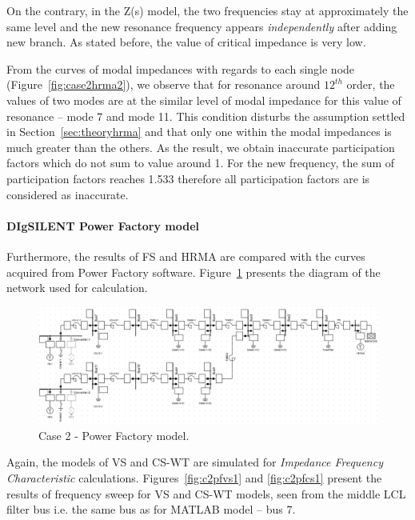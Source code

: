 \documentclass[12pt]{report} %
\begin{document}
On the contrary, in the Z(s) model, the two frequencies stay at approximately the same level and the new resonance frequency appears \textit{independently} after adding new branch. As stated before, the value of critical impedance is very low.

From the curves of modal impedances with regards to each single node (Figure~\ref{fig:case2hrma2}), we observe that for resonance around $12^{th}$ order, the values of two modes are at the similar level of modal impedance for this value of resonance – mode 7 and mode 11. This condition disturbs the assumption settled in Section~\ref{sec:theoryhrma} and \cite{xu2005} that only one within the modal impedances is much greater than the others. As the result, we obtain inaccurate participation factors which do not sum to value around 1. For the new frequency, the sum of participation factors reaches 1.533 therefore all participation factors are is considered as inaccurate.

\paragraph{DIgSILENT Power Factory model}
Furthermore, the results of FS and HRMA are compared with the curves acquired from Power Factory software. Figure~\ref{fig:c2pfmodel} presents the diagram of the network used for calculation.

\begin{figure}[htb]
	\centering
	\includegraphics[width=1\textwidth]{img/Case2/PF_model.png}
  	\caption{Case 2 - Power Factory model.}
  	\label{fig:c2pfmodel}
\end{figure}
\FloatBarrier

Again, the models of VS and CS-WT are simulated for \textit{Impedance Frequency Characteristic} calculations. Figures~\ref{fig:c2pfvs1} and \ref{fig:c2pfcs1} present the results of frequency sweep for VS and CS-WT models, seen from the middle LCL filter bus i.e. the same bus as for MATLAB model – bus 7.
\end{document}
